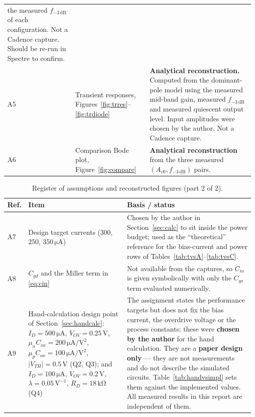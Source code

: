 \documentclass[12pt,a4paper]{article}
\newcommand{\U}[1]{\,\mathrm{#1}}
\begin{document}
\begin{table}[H]
\begin{tabular}{@{}L{0.055\textwidth}L{0.40\textwidth}L{0.47\textwidth}@{}}
     the measured $f_{-3\U{dB}}$ of each configuration. Not a Cadence capture.
     Should be re-run in Spectre to confirm. \\
\addlinespace[3pt]
A5 & Transient responses,
     Figures~\ref{fig:trres}--\ref{fig:trdiode} &
     \textbf{Analytical reconstruction.} Computed from the dominant-pole model
     using the measured mid-band gain, measured $f_{-3\U{dB}}$ and measured
     quiescent output level. Input amplitudes were chosen by the author.
     Not a Cadence capture. \\
\addlinespace[3pt]
A6 & Comparison Bode plot, Figure~\ref{fig:compare} &
     \textbf{Analytical reconstruction} from the three measured
     $(A_{v0},f_{-3\U{dB}})$ pairs. \\
\bottomrule
\end{tabular}
\end{table}

\begin{table}[H]
\centering
\caption{Register of assumptions and reconstructed figures (part 2 of 2).}
\label{tab:assumptions2}
\footnotesize
\begin{tabular}{@{}L{0.055\textwidth}L{0.40\textwidth}L{0.47\textwidth}@{}}
\toprule
\textbf{Ref.} & \textbf{Item} & \textbf{Basis / status} \\
\midrule
A7 & Design target currents ($300$, $250$, $350\U{\mu A}$) &
     Chosen by the author in Section~\ref{sec:calc} to sit inside the power
     budget; used as the ``theoretical'' reference for the bias-current and
     power rows of Tables~\ref{tab:tvsA}--\ref{tab:tvsC}. \\
\addlinespace[3pt]
A8 & $C_{gd}$ and the Miller term in \eqref{eq:cin} &
     Not available from the captures, so $C_{in}$ is given symbolically with
     only the $C_{gs}$ term evaluated numerically. \\
\addlinespace[3pt]
A9 & Hand-calculation design point of Section~\ref{sec:handcalc}:
     $I_D=500\U{\mu A}$, $V_{OV}=0.25\U{V}$, $\mu_n C_{ox}=200\U{\mu A/V^2}$,
     $\mu_p C_{ox}=100\U{\mu A/V^2}$, $|V_{TH}|=0.5\U{V}$ (Q2, Q3); and
     $I_D=100\U{\mu A}$, $V_{OV}=0.2\U{V}$, $\lambda=0.05\U{V^{-1}}$,
     $R_D=18\U{k\Omega}$ (Q4) &
     The assignment states the performance targets but does not fix the bias
     current, the overdrive voltage or the process constants; these were
     \textbf{chosen by the author} for the hand calculation. They are a
     \textbf{paper design only} --- they are not measurements and do not describe the
     simulated circuits. Table~\ref{tab:handvsimpl} sets them against the
     implemented values. All measured results in this report are independent
     of them. \\
\bottomrule
\end{tabular}
\end{table}
\end{document}
